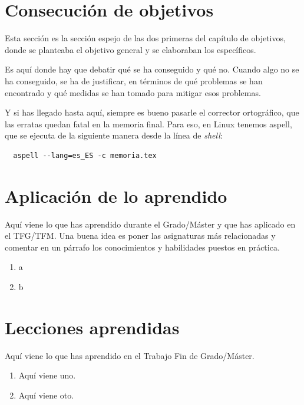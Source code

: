 \documentclass[a4paper, 12pt]{book}
\begin{document}
\section{Consecución de objetivos}
\label{sec:consecucion-objetivos}

Esta sección es la sección espejo de las dos primeras del capítulo de objetivos, donde se planteaba el objetivo general y se elaboraban los específicos.

Es aquí donde hay que debatir qué se ha conseguido y qué no. 
Cuando algo no se ha conseguido, se ha de justificar, en términos de qué problemas se han encontrado y qué medidas se han tomado para mitigar esos problemas.

Y si has llegado hasta aquí, siempre es bueno pasarle el corrector ortográfico, que las erratas quedan fatal en la memoria final.
Para eso, en Linux tenemos aspell, que se ejecuta de la siguiente manera desde la línea de \emph{shell}:

\begin{verbatim}
  aspell --lang=es_ES -c memoria.tex
\end{verbatim}

\section{Aplicación de lo aprendido}
\label{sec:aplicacion}

Aquí viene lo que has aprendido durante el Grado/Máster y que has aplicado en el TFG/TFM. Una buena idea es poner las asignaturas más relacionadas y comentar en un párrafo los conocimientos y habilidades puestos en práctica.

\begin{enumerate}
  \item a
  \item b
\end{enumerate}


\section{Lecciones aprendidas}
\label{sec:lecciones_aprendidas}

Aquí viene lo que has aprendido en el Trabajo Fin de Grado/Máster.

\begin{enumerate}
  \item Aquí viene uno.
  \item Aquí viene oto.
\end{enumerate}
\end{document}
